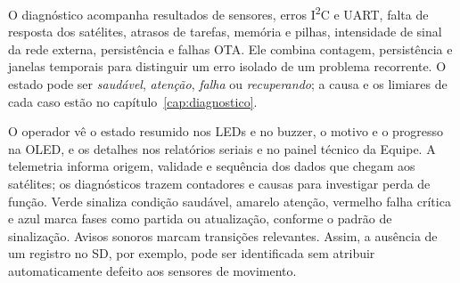 O diagnóstico acompanha resultados de sensores, erros I\textsuperscript{2}C e UART, falta de resposta dos satélites, atrasos de tarefas, memória e pilhas, intensidade de sinal da rede externa, persistência e falhas OTA. Ele combina contagem, persistência e janelas temporais para distinguir um erro isolado de um problema recorrente. O estado pode ser \emph{saudável}, \emph{atenção}, \emph{falha} ou \emph{recuperando}; a causa e os limiares de cada caso estão no capítulo~\ref{cap:diagnostico}.

O operador vê o estado resumido nos LEDs e no buzzer, o motivo e o progresso na OLED, e os detalhes nos relatórios seriais e no painel técnico da Equipe. A telemetria informa origem, validade e sequência dos dados que chegam aos satélites; os diagnósticos trazem contadores e causas para investigar perda de função. Verde sinaliza condição saudável, amarelo atenção, vermelho falha crítica e azul marca fases como partida ou atualização, conforme o padrão de sinalização. Avisos sonoros marcam transições relevantes. Assim, a ausência de um registro no SD, por exemplo, pode ser identificada sem atribuir automaticamente defeito aos sensores de movimento.
